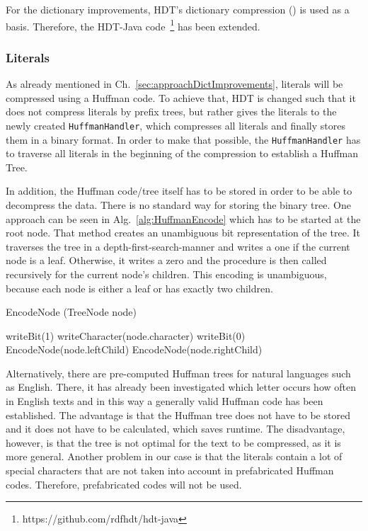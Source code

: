 For the dictionary improvements, HDT's dictionary compression (\DHDT{}) is used as a basis. Therefore, the HDT-Java code~\footnote{https://github.com/rdfhdt/hdt-java} has been extended.

\subsubsection{Literals}\label{sec:implementationLiterals}

As already mentioned in Ch.~\ref{sec:approachDictImprovements}, literals will be compressed using a Huffman code. To achieve that, HDT is changed such that it does not compress literals by prefix trees, but rather gives the literals to the newly created {\tt HuffmanHandler}, which compresses all literals and finally stores them in a binary format. In order to make that possible, the {\tt HuffmanHandler} has to traverse all literals in the beginning of the compression to establish a Huffman Tree.

In addition, the Huffman code/tree itself has to be stored in order to be able to decompress the data. There is no standard way for storing the binary tree. One approach can be seen in Alg.~\ref{alg:HuffmanEncode} which has to be started at the root node. That method creates an unambiguous bit representation of the tree. It traverses the tree in a depth-first-search-manner and writes a one if the current node is a leaf. Otherwise, it writes a zero and the procedure is then called recursively for the current node's children. This encoding is unambiguous, because each node is either a leaf or has exactly two children.

\begin{algorithm}
	\caption{EncodeNode (TreeNode node)}\label{alg:HuffmanEncode}
	\begin{algorithmic}[1]
		\State writeBit(1)
		\State writeCharacter(node.character)
		\Else
		\State writeBit(0)
		\State EncodeNode(node.leftChild)
		\State EncodeNode(node.rightChild)
		\EndIf
	\end{algorithmic}
\end{algorithm}


Alternatively, there are pre-computed Huffman trees for natural languages such as English. There, it has already been investigated which letter occurs how often in English texts and in this way a generally valid Huffman code has been established. The advantage is that the Huffman tree does not have to be stored and it does not have to  be calculated, which saves runtime. The disadvantage, however, is that the tree is not optimal for the text to be compressed, as it is more general. Another problem in our case is that the literals contain a lot of special characters that are not taken into account in prefabricated Huffman codes. Therefore, prefabricated codes will not be used.

